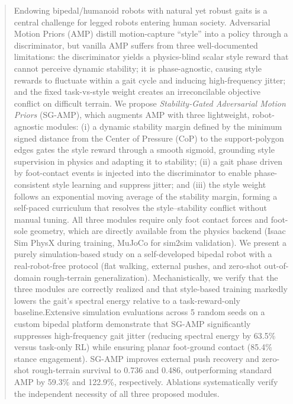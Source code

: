 \documentclass[conference]{IEEEtran}
\begin{document}
\begin{abstract}
Endowing bipedal/humanoid robots with natural yet robust gaits is a central challenge for legged robots entering human society. Adversarial Motion Priors (AMP) distill motion-capture ``style'' into a policy through a discriminator, but vanilla AMP suffers from three well-documented limitations: the discriminator yields a physics-blind scalar style reward that cannot perceive dynamic stability; it is phase-agnostic, causing style rewards to fluctuate within a gait cycle and inducing high-frequency jitter; and the fixed task-vs-style weight creates an irreconcilable objective conflict on difficult terrain. We propose \emph{Stability-Gated Adversarial Motion Priors} (SG-AMP), which augments AMP with three lightweight, robot-agnostic modules: (i) a dynamic stability margin defined by the minimum signed distance from the Center of Pressure (CoP) to the support-polygon edges gates the style reward through a smooth sigmoid, grounding style supervision in physics and adapting it to stability; (ii) a gait phase driven by foot-contact events is injected into the discriminator to enable phase-consistent style learning and suppress jitter; and (iii) the style weight follows an exponential moving average of the stability margin, forming a self-paced curriculum that resolves the style--stability conflict without manual tuning. All three modules require only foot contact forces and foot-sole geometry, which are directly available from the physics backend (Isaac Sim PhysX during training, MuJoCo for sim2sim validation). We present a purely simulation-based study on a self-developed bipedal robot with a real-robot-free protocol (flat walking, external pushes, and zero-shot out-of-domain rough-terrain generalization). Mechanistically, we verify that the three modules are correctly realized and that style-based training markedly lowers the gait's spectral energy relative to a task-reward-only baseline.Extensive simulation evaluations across 5 random seeds on a custom bipedal platform demonstrate that SG-AMP significantly suppresses high-frequency gait jitter (reducing spectral energy by 63.5\% versus task-only RL) while ensuring planar foot-ground contact (85.4\% stance engagement). SG-AMP improves external push recovery and zero-shot rough-terrain survival to 0.736 and 0.486, outperforming standard AMP by 59.3\% and 122.9\%, respectively. Ablations systematically verify the independent necessity of all three proposed modules.
\end{abstract}
\end{document}
